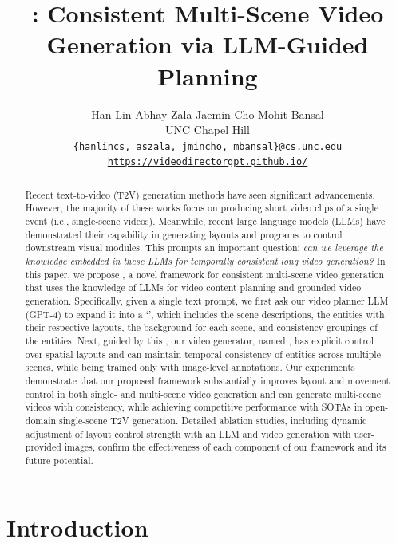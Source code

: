 \documentclass{article}
\title{\method{}: Consistent Multi-Scene Video\\ Generation via LLM-Guided Planning}
\author{Han Lin
\quad
Abhay Zala
\quad
Jaemin Cho
\quad
Mohit Bansal\\
UNC Chapel Hill\\
\texttt{\{hanlincs, aszala, jmincho, mbansal\}@cs.unc.edu} \\
{\tt \normalsize \href{https://videodirectorgpt.github.io/}{https://videodirectorgpt.github.io/}}
}
\begin{document}
\maketitle

\begin{abstract}
Recent text-to-video (T2V) generation methods have seen significant advancements. However, the majority of these works focus on producing short video clips of a single event (i.e., single-scene videos).
Meanwhile, recent large language models (LLMs) have demonstrated their capability in generating layouts and programs to control downstream visual modules.
This prompts an important question: {\sl can we leverage the knowledge embedded in these LLMs for temporally consistent long video generation?} 
In this paper, we propose \method{}, a novel framework for consistent multi-scene video generation that uses the knowledge of LLMs for video content planning and grounded video generation.
Specifically, given a single text prompt, we first ask our video planner LLM (GPT-4) to expand it into a `\videoplan{}', which includes the scene descriptions, the entities with their respective layouts, the background for each scene, and consistency groupings of the entities. 
Next, guided by this \videoplan{}, our video generator, named \videomodule{}, has explicit control over spatial layouts and can maintain temporal consistency of entities across multiple scenes, while being trained only with image-level annotations.
Our experiments demonstrate that our proposed \method{} framework
substantially improves layout and movement control in both single- and multi-scene video generation and can generate multi-scene videos with consistency, while achieving competitive performance with SOTAs in open-domain single-scene T2V generation.
Detailed ablation studies, including dynamic adjustment of layout control strength with an LLM and video generation with user-provided images, confirm the effectiveness of each component of our framework and its future potential.
\end{abstract}


\section{Introduction}
\label{sec:intro}
\end{document}
